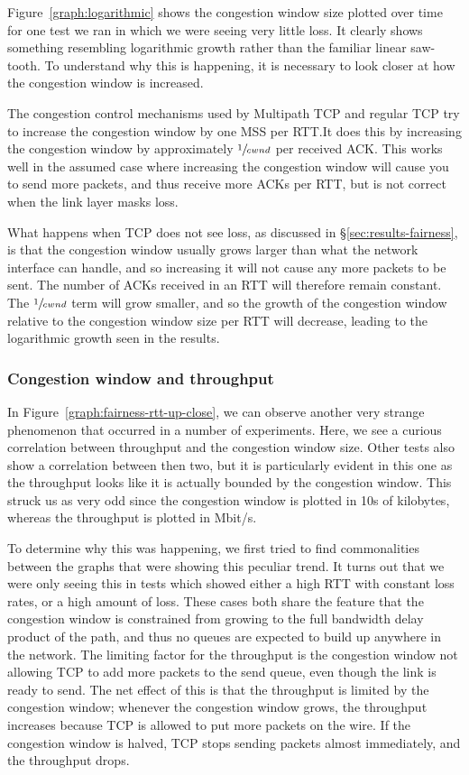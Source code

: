 Figure~\ref{graph:logarithmic} shows the congestion window size plotted over
time for one test we ran in which we were seeing very little loss. It clearly
shows something resembling logarithmic growth rather than the familiar linear
saw-tooth. To understand why this is happening, it is necessary to look closer
at how the congestion window is increased.

The congestion control mechanisms used by Multipath TCP and regular TCP try to
increase the congestion window by one MSS per RTT.\@ It does this by increasing
the congestion window by approximately $\sfrac{1}{cwnd}$ per received ACK.\@
This works well in the assumed case where increasing the congestion window will
cause you to send more packets, and thus receive more ACKs per RTT, but is not
correct when the link layer masks loss.

What happens when TCP does not see loss, as discussed in 
\S\ref{sec:results-fairness}, is %
that the congestion window usually grows larger than what the network interface 
can handle, and so increasing it will not cause any more packets to be sent. 
The number of ACKs received in an RTT will therefore remain constant. The 
$\sfrac{1}{cwnd}$ term will grow smaller, and so the growth of the congestion 
window relative to the congestion window size per RTT will decrease, leading to 
the logarithmic growth seen in the results.

\subsubsection{Congestion window and throughput}

In Figure~\ref{graph:fairness-rtt-up-close}, we can observe another very strange
phenomenon that occurred in a number of experiments. Here, we see a curious
correlation between throughput and the congestion window size. Other tests also
show a correlation between then two, but it is particularly evident in this one
as the throughput looks like it is actually bounded by the congestion window.
This struck us as very odd since the congestion window is plotted in 10s of
kilobytes, whereas the throughput is plotted in Mbit/s.

To determine why this was happening, we first tried to find commonalities
between the graphs that were showing this peculiar trend. It turns out that we
were only seeing this in tests which showed either a high RTT with constant loss
rates, or a high amount of loss. These cases both share the feature that the
congestion window is constrained from growing to the full bandwidth delay
product of the path, and thus no queues are expected to build up anywhere in the
network. The limiting factor for the throughput is the congestion window not
allowing TCP to add more packets to the send queue, even though the link is
ready to send. The net effect of this is that the throughput is limited by the
congestion window; whenever the congestion window grows, the throughput
increases because TCP is allowed to put more packets on the wire. If the
congestion window is halved, TCP stops sending packets almost immediately, and
the throughput drops.


